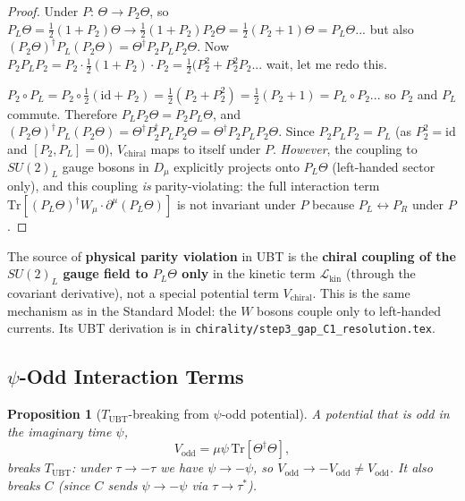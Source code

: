 \documentclass[12pt,a4paper]{article}
\newtheorem{proposition}[theorem]{Proposition}
\theoremstyle{definition}
\theoremstyle{remark}
\begin{document}
\begin{proof}
Under $P$: $\Theta \to P_2\Theta$, so
$P_L\Theta = \tfrac{1}{2}(1+P_2)\Theta \to \tfrac{1}{2}(1+P_2)P_2\Theta
= \tfrac{1}{2}(P_2 + 1)\Theta = P_L\Theta$... but also
$(P_2\Theta)^\dagger P_L (P_2\Theta) = \Theta^\dagger P_2 P_L P_2 \Theta$.
Now $P_2 P_L P_2 = P_2 \cdot \tfrac{1}{2}(1+P_2) \cdot P_2
= \tfrac{1}{2}(P_2^2 + P_2^2 P_2... $ wait, let me redo this.

$P_2 \circ P_L = P_2 \circ \tfrac{1}{2}(\mathrm{id} + P_2) = \tfrac{1}{2}(P_2 + P_2^2) = \tfrac{1}{2}(P_2 + 1) = P_L \circ P_2$... so $P_2$ and $P_L$ commute.
Therefore $P_L P_2 \Theta = P_2 P_L \Theta$, and
$(P_2\Theta)^\dagger P_L (P_2\Theta) = \Theta^\dagger P_2^\dagger P_L P_2 \Theta
= \Theta^\dagger P_2 P_L P_2 \Theta$.
Since $P_2 P_L P_2 = P_L$ (as $P_2^2 = \mathrm{id}$ and $[P_2,P_L]=0$),
$V_{\mathrm{chiral}}$ maps to itself under $P$.
\emph{However}, the coupling to $SU(2)_L$ gauge bosons in $D_\mu$ explicitly
projects onto $P_L\Theta$ (left-handed sector only), and this coupling
\emph{is} parity-violating: the full interaction term
$\mathrm{Tr}[(P_L\Theta)^\dagger W_\mu \cdot \partial^\mu(P_L\Theta)]$
is not invariant under $P$ because $P_L \leftrightarrow P_R$ under $P$.
\end{proof}

\begin{insightbox}
The source of \textbf{physical parity violation} in UBT is the
\textbf{chiral coupling of the $SU(2)_L$ gauge field to $P_L\Theta$ only}
in the kinetic term $\mathcal{L}_{\mathrm{kin}}$ (through the covariant
derivative), not a special potential term $V_{\mathrm{chiral}}$.
This is the same mechanism as in the Standard Model: the $W$ bosons couple
only to left-handed currents.
Its UBT derivation is in \texttt{chirality/step3\_gap\_C1\_resolution.tex}.
\end{insightbox}

\subsection{$\psi$-Odd Interaction Terms}

\begin{proposition}[$T_{\mathrm{UBT}}$-breaking from $\psi$-odd potential]
\label{prop:act:T_psi_odd}
A potential that is odd in the imaginary time $\psi$,
\begin{equation}
  V_{\mathrm{odd}} = \mu \psi\, \mathrm{Tr}[\Theta^\dagger \Theta],
  \label{eq:act:V_odd}
\end{equation}
breaks $T_{\mathrm{UBT}}$: under $\tau \to -\tau$ we have $\psi \to -\psi$,
so $V_{\mathrm{odd}} \to -V_{\mathrm{odd}} \neq V_{\mathrm{odd}}$.
It also breaks $C$ (since $C$ sends $\psi \to -\psi$ via $\tau \to \tau^*$).
\end{proposition}
\end{document}
